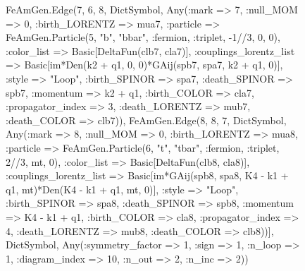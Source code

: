 \documentclass{revtex4}
\begin{document}
\begin{figure}[!htb]
\begin{center}
{FeAmGen.Edge(7, 6, 8, Dict{Symbol, Any}(:mark => 7, :null_MOM => 0, :birth_LORENTZ => mua7, :particle => FeAmGen.Particle(5, "b", "bbar", :fermion, :triplet, -1//3, 0, 0), :color_list => Basic[DeltaFun(clb7, cla7)], :couplings_lorentz_list => Basic[im*Den(k2 + q1, 0, 0)*GAij(spb7, spa7, k2 + q1, 0)], :style => "Loop", :birth_SPINOR => spa7, :death_SPINOR => spb7, :momentum => k2 + q1, :birth_COLOR => cla7, :propagator_index => 3, :death_LORENTZ => mub7, :death_COLOR => clb7)), FeAmGen.Edge(8, 8, 7, Dict{Symbol, Any}(:mark => 8, :null_MOM => 0, :birth_LORENTZ => mua8, :particle => FeAmGen.Particle(6, "t", "tbar", :fermion, :triplet, 2//3, mt, 0), :color_list => Basic[DeltaFun(clb8, cla8)], :couplings_lorentz_list => Basic[im*GAij(spb8, spa8, K4 - k1 + q1, mt)*Den(K4 - k1 + q1, mt, 0)], :style => "Loop", :birth_SPINOR => spa8, :death_SPINOR => spb8, :momentum => K4 - k1 + q1, :birth_COLOR => cla8, :propagator_index => 4, :death_LORENTZ => mub8, :death_COLOR => clb8))], Dict{Symbol, Any}(:symmetry_factor => 1, :sign => 1, :n_loop => 1, :diagram_index => 10, :n_out => 2, :n_inc => 2)) 
}
\end{center}
\end{figure}
\end{document}
